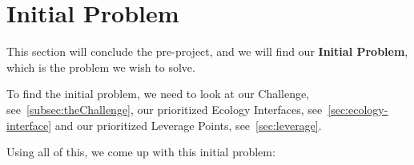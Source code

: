 \section{Initial Problem}
This section will conclude the pre-project, and we will find our \textbf{Initial Problem}, which is the problem we wish to solve.

To find the initial problem, we need to look at our Challenge, see~\autoref{subsec:theChallenge}, our prioritized Ecology Interfaces, see~\autoref{sec:ecology-interface} and our prioritized Leverage Points, see~\autoref{sec:leverage}.

Using all of this, we come up with this initial problem:

\noindent\hrulefill\par
\noindent{} \\


